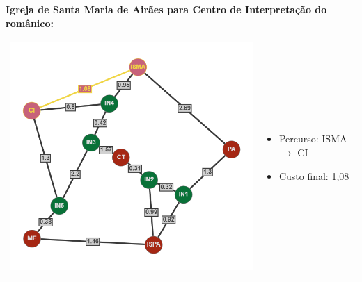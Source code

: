 \documentclass[12pt]{article}
\begin{document}
    \noindent \textbf{Igreja de Santa Maria de Airães para Centro de Interpretação do românico:}\\
    \begin{tabular}{@{}m{}m{}@{}}
      \centering\includegraphics[scale=0.4]{anexos/ISMA-CI.png} &
      \begin{itemize}
        \item Percurso: ISMA $\rightarrow$ CI
        \item Custo final: 1,08
      \end{itemize}
    \end{tabular} 
    
\end{document}
